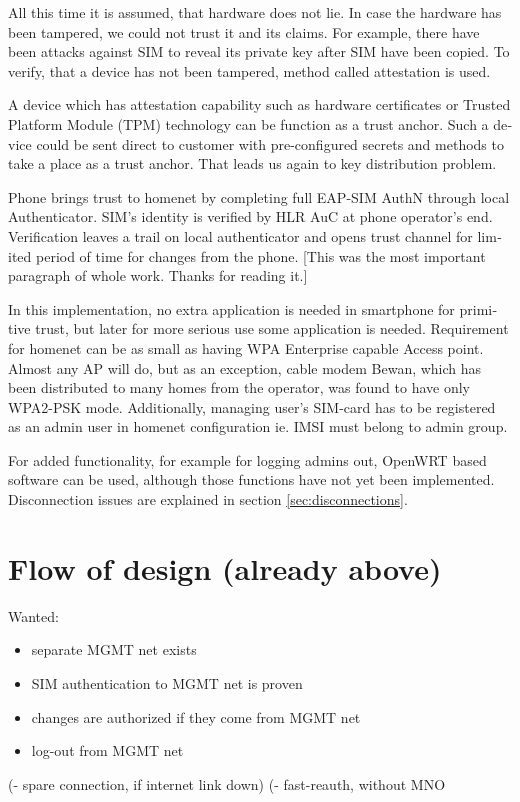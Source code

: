 \documentclass[12pt,a4paper,english]{tutthesis}
\begin{document}
\begin{otherlanguage}{english}
All this time it is assumed, that hardware does not lie. In case
the hardware has been tampered, we could not trust it and its claims.
For example, there have been attacks against SIM to reveal its private
key after SIM have been copied.  To verify, that a device has not been
tampered, method called attestation is used.

A device which has attestation capability such as 
hardware certificates or Trusted Platform Module (TPM) technology
can be function as a trust anchor.
Such a device could be sent direct to customer with pre-configured
secrets and methods to take a place as a trust anchor. 
That leads us again to key distribution problem.






Phone brings trust to homenet by completing full EAP-SIM AuthN through
local Authenticator. SIM's identity is verified by HLR AuC at phone
operator's end. Verification leaves a trail on local authenticator and
opens trust channel for limited period of time for changes from the phone.
[This was the most important paragraph of whole work. Thanks for
reading it.]





In this implementation, no extra application is needed in smartphone
for primitive trust, but later for more serious use some application is needed.
Requirement for homenet can be as small as having WPA Enterprise capable
Access point. Almost any AP will  do, but as an exception, cable modem Bewan, which 
has been distributed to many homes from the operator, was found to have only WPA2-PSK mode.
Additionally, managing user's SIM-card has to be registered as an admin user in homenet 
configuration ie. IMSI must belong to admin group.


 For added functionality, for example for
logging admins out, OpenWRT based software can be used, although those
functions have not yet been implemented. Disconnection issues are
explained in section \ref{sec:disconnections}.

\section{Flow of design (already above)}
\label{sec-4-2}

Wanted: 
\begin{itemize}
\item separate MGMT net exists
\item SIM authentication to MGMT net is proven
\item changes are authorized if they come from MGMT net
\item log-out from MGMT net
\end{itemize}
(- spare connection, if internet link down)
(- fast-reauth, without MNO


\end{otherlanguage}
\end{document}
